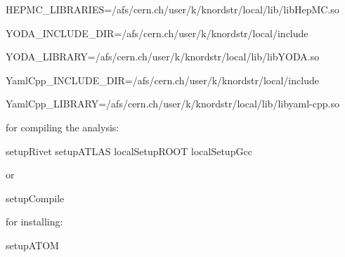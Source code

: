 HEPMC_LIBRARIES=/afs/cern.ch/user/k/knordstr/local/lib/libHepMC.so

YODA_INCLUDE_DIR=/afs/cern.ch/user/k/knordstr/local/include

YODA_LIBRARY=/afs/cern.ch/user/k/knordstr/local/lib/libYODA.so

YamlCpp_INCLUDE_DIR=/afs/cern.ch/user/k/knordstr/local/include

YamlCpp_LIBRARY=/afs/cern.ch/user/k/knordstr/local/lib/libyaml-cpp.so

for compiling the analysis:


setupRivet
setupATLAS
localSetupROOT
localSetupGcc

or

setupCompile

for installing:

setupATOM

